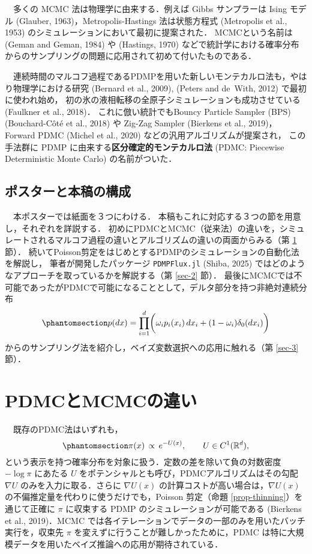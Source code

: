 \documentclass[
]{article}
\theoremstyle{StatementsWithUnderline}\newtheorem{theorem}{定理}[section]\newtheorem{definition}[theorem]{定義}\newtheorem{corollary}[theorem]{系}\newtheorem{proposition}[theorem]{命題}\newtheorem{lemma}[theorem]{補題}\newtheorem{example}[theorem]{例}
\theoremstyle{definition}\newtheorem{notation}[theorem]{記法}\newtheorem{algorithm}[theorem]{算譜}\newtheorem{remarks}[theorem]{要諦}\newtheorem{remark}[theorem]{注}
\begin{document}
　多くの MCMC 法は物理学に由来する．例えば Gibbs サンプラーは Ising
モデル (Glauber, 1963)，Metropolis-Hastings 法は状態方程式 (Metropolis
et al., 1953) のシミュレーションにおいて最初に提案された．
MCMCという名前は (Geman and Geman, 1984) や (Hastings, 1970)
などで統計学における確率分布からのサンプリングの問題に応用されて初めて付いたものである．

　連続時間のマルコフ過程であるPDMPを用いた新しいモンテカルロ法も，やはり物理学における研究
(Bernard et al., 2009), (Peters and de~With, 2012) で最初に使われ始め，
初の氷の液相転移の全原子シミュレーションも成功させている (Faulkner et
al., 2018)． これに倣い統計でもBouncy Particle Sampler (BPS)
(Bouchard-Côté et al., 2018) や Zig-Zag Sampler (Bierkens et al.,
2019)，Forward PDMC (Michel et al., 2020)
などの汎用アルゴリズムが提案され， この手法群に PDMP
に由来する\textbf{区分確定的モンテカルロ法} (PDMC: Piecewise
Deterministic Monte Carlo) の名前がついた．

\subsection{ポスターと本稿の構成}\label{ux30ddux30b9ux30bfux30fcux3068ux672cux7a3fux306eux69cbux6210}

　本ポスターでは紙面を３つにわける．
本稿もこれに対応する３つの節を用意し，それぞれを詳説する．
初めにPDMCとMCMC（従来法）の違いを，シミュレートされるマルコフ過程の違いとアルゴリズムの違いの両面からみる（第
\ref{sec-1} 節）．
続いてPoisson剪定をはじめとするPDMPのシミュレーションの自動化法を解説し，
筆者が開発したパッケージ \texttt{PDMPFlux.jl} (Shiba, 2025)
ではどのようなアプローチを取っているかを解説する（第 \ref{sec-2} 節）．
最後にMCMCでは不可能であったがPDMCで可能になることとして，デルタ部分を持つ非絶対連続分布
\begin{equation}\phantomsection\label{eq-spike-and-slab}{
p(dx)=\prod_{i=1}^d\biggr(\omega_ip_i(x_i)\,dx_i+(1-\omega_i)\delta_0(dx_i)\biggl)
}\end{equation}
からのサンプリング法を紹介し，ベイズ変数選択への応用に触れる（第
\ref{sec-3} 節）．

\section{PDMCとMCMCの違い}\label{sec-1}

　既存のPDMC法はいずれも， \begin{equation}\phantomsection\label{eq-pi}{
\pi(x)\,\propto\,e^{-U(x)},\qquad U\in C^1(\mathbb{R}^d),
}\end{equation}
という表示を持つ確率分布を対象に扱う．定数の差を除いて負の対数密度
\(-\log\pi\) にあたる \(U\)
をポテンシャルとも呼び，PDMCアルゴリズムはその勾配 \(\nabla U\)
のみを入力に取る．さらに \(\nabla U(x)\)
の計算コストが高い場合は，\(\nabla U(x)\)
の不偏推定量を代わりに使うだけでも，Poisson 剪定（命題
\ref{prop-thinning}）を通じて正確に \(\pi\) に収束する PDMP
のシミュレーションが可能である (Bierkens et al., 2019)．MCMC
では各イテレーションでデータの一部のみを用いたバッチ実行を，収束先
\(\pi\) を変えずに行うことが難しかったために，PDMC
は特に大規模データを用いたベイズ推論への応用が期待されている．
\end{document}
